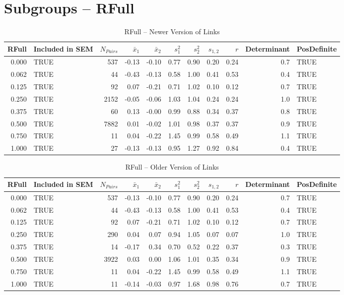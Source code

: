 \documentclass{article}\usepackage[]{graphicx}\usepackage[]{color}
\begin{document}
\section{Subgroups --  RFull }%
\begin{table}[ht]
\centering
\begin{tabular}{rlrrrrrrrrl}
  \hline
RFull & Included in SEM & $N_{Pairs}$ & $\bar{x}_1$ & $\bar{x}_2$ & $s_1^2$ & $s_2^2$ & $s_{1,2}$ & $r$ & Determinant & PosDefinite \\ 
  \hline
0.000 & TRUE & 537 & -0.13 & -0.10 & 0.77 & 0.90 & 0.20 & 0.24 & 0.7 & TRUE \\ 
  0.062 & TRUE & 44 & -0.43 & -0.13 & 0.58 & 1.00 & 0.41 & 0.53 & 0.4 & TRUE \\ 
  0.125 & TRUE & 92 & 0.07 & -0.21 & 0.71 & 1.02 & 0.10 & 0.12 & 0.7 & TRUE \\ 
  0.250 & TRUE & 2152 & -0.05 & -0.06 & 1.03 & 1.04 & 0.24 & 0.24 & 1.0 & TRUE \\ 
  0.375 & TRUE & 60 & 0.13 & -0.00 & 0.99 & 0.88 & 0.34 & 0.37 & 0.8 & TRUE \\ 
  0.500 & TRUE & 7882 & 0.01 & -0.02 & 1.01 & 0.98 & 0.37 & 0.37 & 0.9 & TRUE \\ 
  0.750 & TRUE & 11 & 0.04 & -0.22 & 1.45 & 0.99 & 0.58 & 0.49 & 1.1 & TRUE \\ 
  1.000 & TRUE & 27 & -0.13 & -0.13 & 0.95 & 1.27 & 0.92 & 0.84 & 0.4 & TRUE \\ 
   \hline
\end{tabular}
\caption{RFull -- Newer Version of Links} 
\end{table}
\begin{table}[ht]
\centering
\begin{tabular}{rlrrrrrrrrl}
  \hline
RFull & Included in SEM & $N_{Pairs}$ & $\bar{x}_1$ & $\bar{x}_2$ & $s_1^2$ & $s_2^2$ & $s_{1,2}$ & $r$ & Determinant & PosDefinite \\ 
  \hline
0.000 & TRUE & 537 & -0.13 & -0.10 & 0.77 & 0.90 & 0.20 & 0.24 & 0.7 & TRUE \\ 
  0.062 & TRUE & 44 & -0.43 & -0.13 & 0.58 & 1.00 & 0.41 & 0.53 & 0.4 & TRUE \\ 
  0.125 & TRUE & 92 & 0.07 & -0.21 & 0.71 & 1.02 & 0.10 & 0.12 & 0.7 & TRUE \\ 
  0.250 & TRUE & 290 & 0.04 & 0.07 & 0.94 & 1.05 & 0.07 & 0.07 & 1.0 & TRUE \\ 
  0.375 & TRUE & 14 & -0.17 & 0.34 & 0.70 & 0.52 & 0.22 & 0.37 & 0.3 & TRUE \\ 
  0.500 & TRUE & 3922 & 0.03 & 0.00 & 1.06 & 1.01 & 0.35 & 0.34 & 0.9 & TRUE \\ 
  0.750 & TRUE & 11 & 0.04 & -0.22 & 1.45 & 0.99 & 0.58 & 0.49 & 1.1 & TRUE \\ 
  1.000 & TRUE & 11 & -0.14 & -0.03 & 0.97 & 1.68 & 0.98 & 0.76 & 0.7 & TRUE \\ 
   \hline
\end{tabular}
\caption{RFull -- Older Version of Links} 
\end{table}
\end{document}
